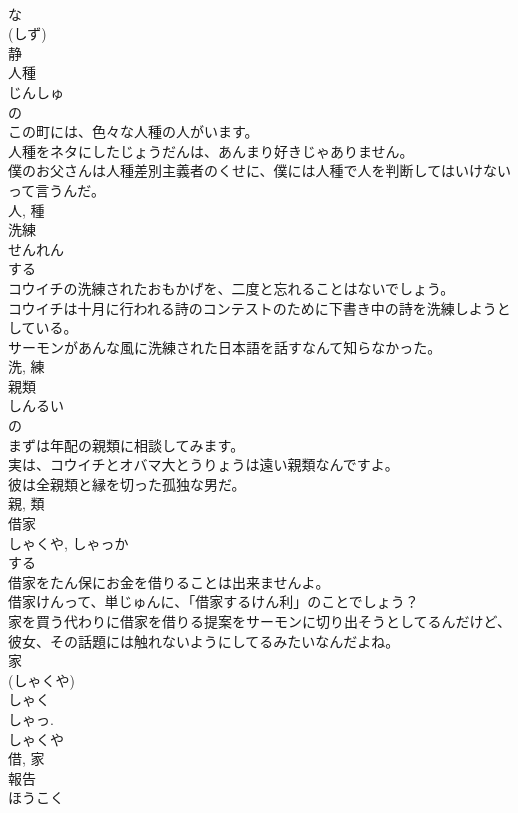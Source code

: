 \documentclass[8pt]{extreport}
\begin{document}
\begin{CJK}{UTF8}{min}
\\	な 
\\	(しず) 
\\	静	
\\	人種	
\\	じんしゅ	
\\	の 
\\	この町には、色々な人種の人がいます。	
\\	人種をネタにしたじょうだんは、あんまり好きじゃありません。	
\\	僕のお父さんは人種差別主義者のくせに、僕には人種で人を判断してはいけないって言うんだ。	
\\	人, 種	
\\	洗練	
\\	せんれん	
\\	する 
\\	コウイチの洗練されたおもかげを、二度と忘れることはないでしょう。	
\\	コウイチは十月に行われる詩のコンテストのために下書き中の詩を洗練しようとしている。	
\\	サーモンがあんな風に洗練された日本語を話すなんて知らなかった。	
\\	洗, 練	
\\	親類	
\\	しんるい	
\\	の 
\\	まずは年配の親類に相談してみます。	
\\	実は、コウイチとオバマ大とうりょうは遠い親類なんですよ。	
\\	彼は全親類と縁を切った孤独な男だ。	
\\	親, 類	
\\	借家	
\\	しゃくや, しゃっか	
\\	する 
\\	借家をたん保にお金を借りることは出来ませんよ。	
\\	借家けんって、単じゅんに、「借家するけん利」のことでしょう？	
\\	家を買う代わりに借家を借りる提案をサーモンに切り出そうとしてるんだけど、彼女、その話題には触れないようにしてるみたいなんだよね。	
\\	家 
\\	(しゃくや) 
\\	しゃく 
\\	しゃっ. 
\\	しゃくや 
\\	借, 家	
\\	報告	
\\	ほうこく	

\end{CJK}
\end{document}
